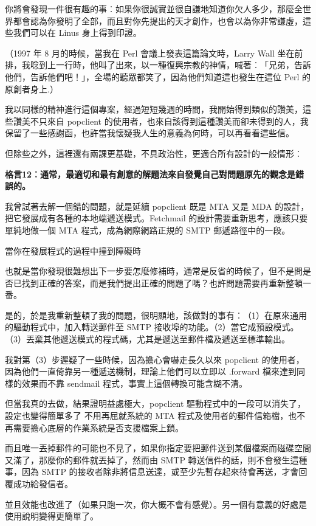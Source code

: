 \documentclass[12pt,]{article}
\makeatletter
\newcommand*{\shifttext}[2]{%
  \settowidth{\@tempdima}{#2}%
  \makebox[\@tempdima]{\hspace*{#1}#2}%
}
\makeatother
\begin{document}
你將會發現一件很有趣的事︰如果你很誠實並很自謙地知道你欠人多少，那麼全世界都會認為你發明了全部，而且對你先提出的天才創作，也會以為你非常謙虛，這些我們可以在
Linus 身上得到印證。

（1997 年 8 月的時候，當我在 Perl 會議上發表這篇論文時，Larry Wall
坐在前排，我唸到上一行時，他叫了出來，以一種復興宗教的神情，喊著︰「兄弟，告訴他們，告訴他們吧！」，全場的聽眾都笑了，因為他們知道這也發生在這位
Perl 的原創者身上.）

我以同樣的精神進行這個專案，經過短短幾週的時間，我開始得到類似的讚美，這些讚美不只來自
popclient
的使用者，也來自該得到這種讚美而卻未得到的人，我保留了一些感謝函，也許當我懷疑我人生的意義為何時，可以再看看這些信。

但除些之外，這裡還有兩課更基礎，不具政治性，更適合所有設計的一般情形︰

\textbf{格言12︰通常，最適切和最有創意的解題法來自發覺自己對問題原先的觀念是錯誤的。}

我曾試著去解一個錯的問題，就是延續 popclient 既是 MTA 又是 MDA
的設計，把它發展成有各種的本地端遞送模式。Fetchmail
的設計需要重新思考，應該只要單純地做一個 MTA 程式，成為網際網路正規的 SMTP
郵遞路徑中的一段。

當你在發展程式的過程中撞到障礙時 \shifttext{1pt}{---}\shifttext{-1pt}{---}
也就是當你發現很難想出下一步要怎麼修補時，通常是反省的時候了，但不是問是否已找到正確的答案，而是我們提出正確的問題了嗎？也許問題需要再重新整頓一番。

是的，於是我重新整頓了我的問題，很明顯地，該做對的事有︰（1）在原來通用的驅動程式中，加入轉送郵件至
SMTP
接收埠的功能。（2）當它成預設模式。（3）丟棄其他遞送模式的程式碼，尤其是遞送至郵件檔及遞送至標準輸出。

我對第（3）步遲疑了一些時候，因為擔心會嚇走長久以來 popclient
的使用者，因為他們一直倚靠另一種遞送機制，理論上他們可以立即以 .forward
檔來達到同樣的效果而不靠 sendmail 程式，事實上這個轉換可能含糊不清。

但當我真的去做，結果證明益處極大，popclient
驅動程式中的一段可以消失了，設定也變得簡單多了 \shifttext{1pt}{---}\shifttext{-1pt}{---} 不用再屈就系統的
MTA
程式及使用者的郵件信箱檔，也不再需要擔心底層的作業系統是否支援檔案上鎖。

而且唯一丟掉郵件的可能也不見了，如果你指定要把郵件送到某個檔案而磁碟空間又滿了，那麼你的郵件就丟掉了，然而由
SMTP 轉送信件的話，則不會發生這種事，因為 SMTP
的接收者除非將信息送達，或至少先暫存起來待會再送，才會回覆成功給發信者。

並且效能也改進了（如果只跑一次，你大概不會有感覺）。另一個有意義的好處是使用說明變得更簡單了。
\end{document}

